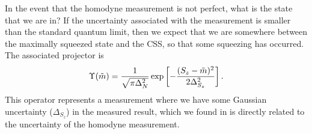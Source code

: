 In the event that the homodyne measurement is not perfect, what is the state
that we are in? If the uncertainty associated with the measurement is smaller
than the standard quantum limit, then we expect that we are somewhere between
the maximally squeezed state and the CSS, so that some squeezing has
occurred.
%
The associated projector is~\cite{MAURODARIANO2003205, Vanner16182, Cox2016}
%
\begin{equation}
  \Upsilon(\tilde{m}) = \frac{1}{\sqrt{\pi\Delta_N^2}}\exp\left[
    -\frac{(S_z-\tilde{m})^2}{2\Delta_{S_z}^2}\right].
\end{equation}
%
This operator represents a measurement where we have some Gaussian uncertainty
($\Delta_{S_z}$) in the measured result, which we found in
 is directly related to the uncertainty of the
homodyne measurement.


